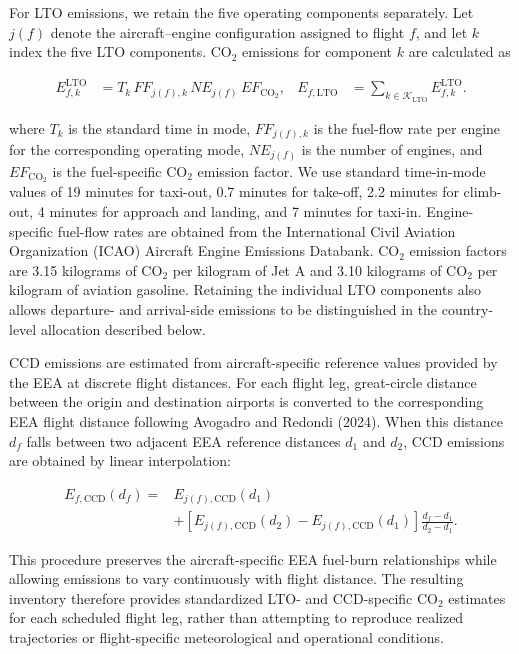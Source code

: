 \documentclass[12pt]{extarticle}
\begin{document}
For LTO emissions, we retain the five operating components separately. Let $j(f)$ denote the aircraft--engine configuration assigned to flight $f$, and let $k$ index the five LTO components. CO$_2$ emissions for component $k$ are calculated as

\begin{equation}
\begin{aligned}
E_{f,k}^{\mathrm{LTO}}
&=
T_k
\,FF_{j(f),k}
\,NE_{j(f)}
\,EF_{\mathrm{CO_2}},
&
E_{f,\mathrm{LTO}}
&=
\sum_{k\in\mathcal K_{\mathrm{LTO}}}
E_{f,k}^{\mathrm{LTO}}.
\end{aligned}
\label{eq:nature_2}
\end{equation}

where $T_k$ is the standard time in mode, $FF_{j(f),k}$ is the fuel-flow rate per engine for the corresponding operating mode, $NE_{j(f)}$ is the number of engines, and $EF_{\mathrm{CO_2}}$ is the fuel-specific CO$_2$ emission factor. We use standard time-in-mode values of 19 minutes for taxi-out, 0.7 minutes for take-off, 2.2 minutes for climb-out, 4 minutes for approach and landing, and 7 minutes for taxi-in. Engine-specific fuel-flow rates are obtained from the International Civil Aviation Organization (ICAO) Aircraft Engine Emissions Databank. CO$_2$ emission factors are 3.15 kilograms of CO$_2$ per kilogram of Jet A and 3.10 kilograms of CO$_2$ per kilogram of aviation gasoline. Retaining the individual LTO components also allows departure- and arrival-side emissions to be distinguished in the country-level allocation described below.

CCD emissions are estimated from aircraft-specific reference values provided by the EEA at discrete flight distances. For each flight leg, great-circle distance between the origin and destination airports is converted to the corresponding EEA flight distance following Avogadro and Redondi (2024). When this distance $d_f$ falls between two adjacent EEA reference distances $d_1$ and $d_2$, CCD emissions are obtained by linear interpolation:

\begin{equation}
\begin{split}
E_{f,\mathrm{CCD}}(d_f)
={}&
E_{j(f),\mathrm{CCD}}(d_1)\\
&+
\left[
E_{j(f),\mathrm{CCD}}(d_2)
-
E_{j(f),\mathrm{CCD}}(d_1)
\right]
\frac{d_f-d_1}{d_2-d_1}.
\end{split}
\label{eq:nature_3}
\end{equation}

This procedure preserves the aircraft-specific EEA fuel-burn relationships while allowing emissions to vary continuously with flight distance. The resulting inventory therefore provides standardized LTO- and CCD-specific CO$_2$ estimates for each scheduled flight leg, rather than attempting to reproduce realized trajectories or flight-specific meteorological and operational conditions.
\end{document}
